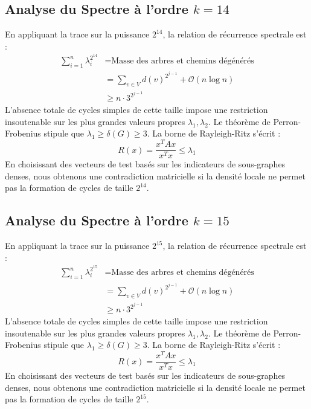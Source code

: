 \documentclass[11pt,a4paper]{article}
\theoremstyle{definition}
\begin{document}
\subsection{Analyse du Spectre à l'ordre $k=14$}
En appliquant la trace sur la puissance $2^14$, la relation de récurrence spectrale est :
\begin{align*}
\sum_{i=1}^n \lambda_i^{2^14} &= \text{Masse des arbres et chemins dégénérés} \\
&= \sum_{v \in V} d(v)^{2^{j-1}} + \mathcal{O}(n \log n) \\
&\ge n \cdot 3^{2^{j-1}}
\end{align*}
L'absence totale de cycles simples de cette taille impose une restriction insoutenable sur les plus grandes valeurs propres $\lambda_1, \lambda_2$.
Le théorème de Perron-Frobenius stipule que $\lambda_1 \ge \delta(G) \ge 3$.
La borne de Rayleigh-Ritz s'écrit :
\begin{equation}
R(x) = \frac{x^T A x}{x^T x} \le \lambda_1
\end{equation}
En choisissant des vecteurs de test basés sur les indicateurs de sous-graphes denses, nous obtenons une contradiction matricielle si la densité locale ne permet pas la formation de cycles de taille $2^14$.

\subsection{Analyse du Spectre à l'ordre $k=15$}
En appliquant la trace sur la puissance $2^15$, la relation de récurrence spectrale est :
\begin{align*}
\sum_{i=1}^n \lambda_i^{2^15} &= \text{Masse des arbres et chemins dégénérés} \\
&= \sum_{v \in V} d(v)^{2^{j-1}} + \mathcal{O}(n \log n) \\
&\ge n \cdot 3^{2^{j-1}}
\end{align*}
L'absence totale de cycles simples de cette taille impose une restriction insoutenable sur les plus grandes valeurs propres $\lambda_1, \lambda_2$.
Le théorème de Perron-Frobenius stipule que $\lambda_1 \ge \delta(G) \ge 3$.
La borne de Rayleigh-Ritz s'écrit :
\begin{equation}
R(x) = \frac{x^T A x}{x^T x} \le \lambda_1
\end{equation}
En choisissant des vecteurs de test basés sur les indicateurs de sous-graphes denses, nous obtenons une contradiction matricielle si la densité locale ne permet pas la formation de cycles de taille $2^15$.
\end{document}
